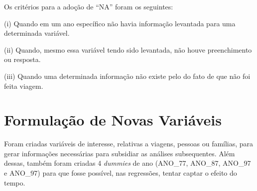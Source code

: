 \begin{table}[htb]
\end{table}

Os critérios para a adoção de ``NA'' foram os seguintes:

\begin{compactitem}[]
\item (i) Quando em um ano específico não havia informação levantada para uma determinada variável.
\item (ii) Quando, mesmo essa variável tendo sido levantada, não houve preenchimento ou resposta.
\item (iii) Quando uma determinada informação não existe pelo do fato de que não foi feita viagem.
\end{compactitem}


\section{Formulação de Novas Variáveis}\label{sec:bd-novas-var}

Foram criadas variáveis de interesse, relativas a viagens, pessoas ou famílias, para gerar informações necessárias para subsidiar as análises subsequentes.
Além dessas, também foram criadas 4 \textit{dummies} de ano (ANO_77, ANO_87, ANO_97 e ANO_97) para que fosse possível, nas regressões, tentar captar o efeito do tempo.

